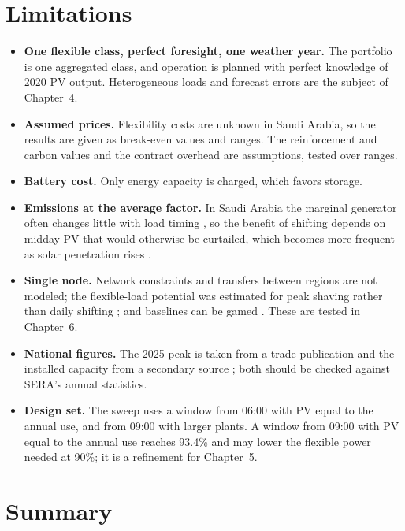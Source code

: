 \section{Limitations}\label{sec:3-13}

\begin{itemize}
\item \textbf{One flexible class, perfect foresight, one weather year.} The portfolio is one aggregated class, and operation is planned with perfect knowledge of 2020 PV output. Heterogeneous loads and forecast errors are the subject of Chapter~4.
\item \textbf{Assumed prices.} Flexibility costs are unknown in Saudi Arabia, so the results are given as break-even values and ranges. The reinforcement and carbon values and the contract overhead are assumptions, tested over ranges.
\item \textbf{Battery cost.} Only energy capacity is charged, which favors storage.
\item \textbf{Emissions at the average factor.} In Saudi Arabia the marginal generator often changes little with load timing \cite{r38}, so the benefit of shifting depends on midday PV that would otherwise be curtailed, which becomes more frequent as solar penetration rises \cite{r23,r44}.
\item \textbf{Single node.} Network constraints and transfers between regions are not modeled; the flexible-load potential was estimated for peak shaving rather than daily shifting \cite{r23}; and baselines can be gamed \cite{r45}. These are tested in Chapter~6.
\item \textbf{National figures.} The 2025 peak is taken from a trade publication \cite{mees2026} and the installed capacity from a secondary source \cite{v2030cap}; both should be checked against SERA's annual statistics.
\item \textbf{Design set.} The sweep uses a window from 06:00 with PV equal to the annual use, and from 09:00 with larger plants. A window from 09:00 with PV equal to the annual use reaches 93.4\% and may lower the flexible power needed at 90\%; it is a refinement for Chapter~5.
\end{itemize}

\section{Summary}\label{sec:3-14}

